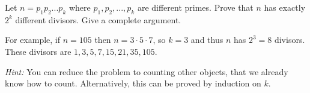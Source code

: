 

\begin{problem}
Let $n = p_1p_2...p_k$ where $p_1,p_2,...,p_k$ are different primes.	
Prove that $n$ has exactly $2^k$ different divisors. Give a complete argument.

For example, if $n =105$ then $n = 3\cdot 5 \cdot 7$, so $k=3$ and
thus $n$ has $2^3 = 8$ divisors. These divisors are $1,3,5,7,15,21,35,105$.

\emph{Hint:} You can reduce the problem to counting other objects, that we already
know how to count. Alternatively, this can be proved by induction on $k$.
\end{problem}

